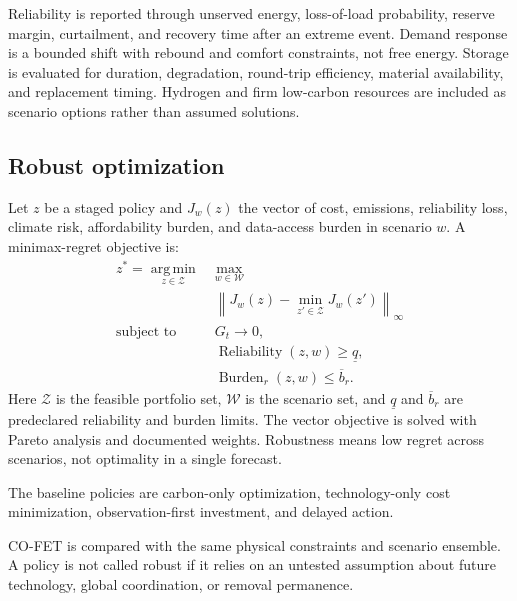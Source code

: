 \documentclass[conference]{IEEEtran}
\begin{document}
Reliability is reported through unserved energy, loss-of-load probability, reserve margin, curtailment, and recovery time after an extreme event. Demand response is a bounded shift with rebound and comfort constraints, not free energy. Storage is evaluated for duration, degradation, round-trip efficiency, material availability, and replacement timing. Hydrogen and firm low-carbon resources are included as scenario options rather than assumed solutions.

\subsection{Robust optimization}
Let $z$ be a staged policy and $J_w(z)$ the vector of cost, emissions, reliability loss, climate risk, affordability burden, and data-access burden in scenario $w$. A minimax-regret objective is:
\begin{equation}
\begin{aligned}
z^*=\mathop{\mathrm{arg\,min}}\limits_{z\in\mathcal{Z}}\; &\max_{w\in\mathcal{W}}\nonumber\\
&\left\|J_w(z)-\min_{z'\in\mathcal{Z}}J_w(z')\right\|_\infty\\
\text{subject to }&G_t\rightarrow 0,\nonumber\\
&\operatorname{Reliability}(z,w)\geq \underline{q},\nonumber\\
&\operatorname{Burden}_{r}(z,w)\leq \overline{b}_r.
\end{aligned}
\label{eq:robust}
\end{equation}
Here $\mathcal{Z}$ is the feasible portfolio set, $\mathcal{W}$ is the scenario set, and $\underline{q}$ and $\overline{b}_r$ are predeclared reliability and burden limits. The vector objective is solved with Pareto analysis and documented weights. Robustness means low regret across scenarios, not optimality in a single forecast.

\begin{sloppypar}
The baseline policies are carbon-only optimization, technology-only cost minimization, observation-first investment, and delayed action.

CO-FET is compared with the same physical constraints and scenario ensemble. A policy is not called robust if it relies on an untested assumption about future technology, global coordination, or removal permanence.
\end{sloppypar}
\end{document}
